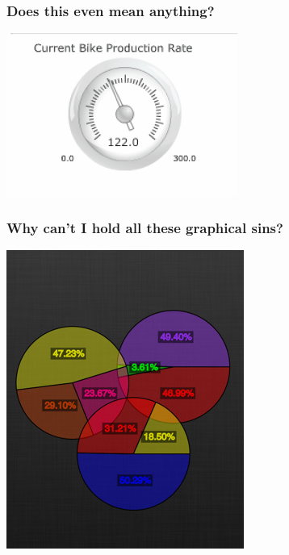 \documentclass{beamer}
\begin{document}
\begin{frame}
  \frametitle{Does this even mean anything?}
  \includegraphics[width = \textwidth, keepaspectratio = true]{figure/gauge1}
\end{frame}

\begin{frame}
  \frametitle{Why can't I hold all these graphical sins?}
  \begin{center}
    \includegraphics[height = 0.8\textheight, keepaspectratio = true]{figure/pie-agram}
  \end{center}
\end{frame}
\end{document}
